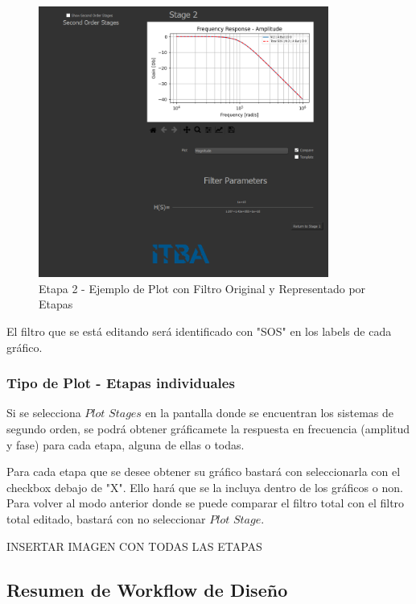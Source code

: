 \begin{figure}[H]
    \centering
    \includegraphics[width=0.85\textwidth]{../Ejercicio1-FilterTool/Imagenes/comparacion.png}
    \caption{Etapa 2 - Ejemplo de Plot con Filtro Original y Representado por Etapas}
\end{figure}

El filtro que se está editando será identificado con "SOS" en los labels de cada gráfico.

\subsubsection{Tipo de Plot - Etapas individuales}

Si se selecciona $Plot$ $Stages$ en la pantalla donde se encuentran los sistemas de segundo orden, se podrá obtener gráficamete la respuesta en frecuencia (amplitud y fase) para cada etapa, alguna de ellas o todas.

Para cada etapa que se desee obtener su gráfico bastará con seleccionarla con el checkbox debajo de "X". Ello hará que se la incluya dentro de los gráficos o non. Para volver al modo anterior donde se puede comparar el filtro total con el filtro total editado,
bastará con no seleccionar $Plot$ $Stage$.

INSERTAR IMAGEN CON TODAS LAS ETAPAS

\subsection{Resumen de Workflow de Diseño}

